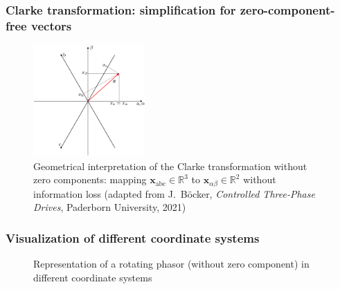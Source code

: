 \begin{frame}
	\frametitle{Clarke transformation: simplification for zero-component-free vectors}
    \begin{figure}
        \centering
        \includegraphics[width=0.38\textwidth]{fig/lec06/abc_alphabeta_vectors.pdf}
        \caption{Geometrical interpretation of the Clarke
        transformation without zero components: mapping $\bm{x}_\mathrm{abc}\in\mathbb{R}^3$ to $\bm{x}_{\alpha\beta}\in\mathbb{R}^2$ without information loss (adapted from J.~B\"ocker, \textit{Controlled Three-Phase Drives}, Paderborn University, 2021)}
        \label{fig:abc_alphabeta_vectors}
    \end{figure}    
\end{frame}

\begin{frame}
	\frametitle{Visualization of different coordinate systems}
    \begin{figure}
        \centering
        \vspace{-0.25cm}
        \caption{Representation of a rotating phasor (without zero component) in different coordinate systems}
        \label{fig:Clarke_Park_animation}
    \end{figure}
\end{frame}